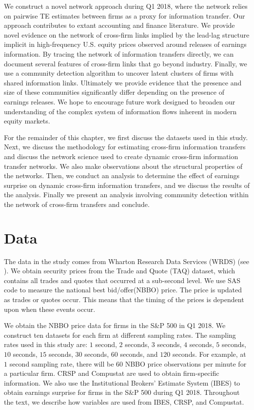 We construct a novel network approach during Q1 2018,  where the network relies on pairwise TE estimates between firms as a proxy for information transfer. Our approach contributes to extant accounting and finance literature.  We provide novel evidence on the network of cross-firm links implied by the lead-lag structure implicit in high-frequency U.S. equity prices observed around releases of earnings information.  By tracing the network of information transfers directly,  we can document several features of cross-firm links that go beyond industry.  Finally,  we use a community detection algorithm to uncover latent clusters of firms with shared information links.  Ultimately we provide evidence that the presence and size of these communities significantly differ depending on the presence of earnings releases.  We hope to encourage future work designed to broaden our understanding of the complex system of information flows inherent in modern equity markets. 

For the remainder of this chapter,  we first discuss the datasets used in this study.   Next, we discuss the methodology for estimating cross-firm information transfers and discuss the network science used to create dynamic cross-firm information transfer networks. We also make observations about the structural properties of the networks.  Then, we conduct an analysis to determine the effect of earnings surprise on dynamic cross-firm information transfers, and we discuss the results of the analysis.  Finally we present an analysis involving community detection within the network of cross-firm transfers and conclude.

\section{Data}
The data in the study comes from Wharton Research Data Services (WRDS) (see \cite{WRDS}). We obtain security prices from the Trade and Quote (TAQ) dataset, which contains all trades and quotes that occurred at a sub-second level.  We use \cite{HoldenJacobsen2014} SAS code to measure the national best bid/offer(NBBO) price. The price is updated as trades or quotes occur.  This means that the timing of the prices is dependent upon when these events occur.  %

We obtain the NBBO price data for firms in the S\&P 500 in Q1 2018.  We construct ten datasets for each firm at different sampling rates. The sampling rates used in this study are: $1$ second,  $2$ seconds,  $3$ seconds,  $4$ seconds,  $5$ seconds, $10$ seconds,  $15$ seconds,  $30$ seconds,  $60$ seconds,  and $120$ seconds.  For example, at $1$ second sampling rate, there will be 60 NBBO price observations per minute for a particular firm.  CRSP and Compustat are used to obtain firm-specific information.  We also use the Institutional Brokers' Estimate System (IBES) to obtain earnings surprise for firms in the S\&P 500 during Q1 2018.  Throughout the text, we describe how variables are used from IBES, CRSP, and Compustat. 

